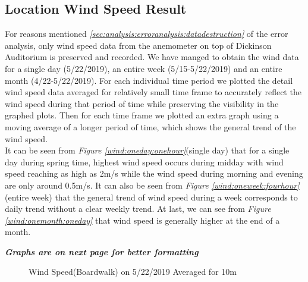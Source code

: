 \documentclass[review]{elsarticle}
\begin{document}
\clearpage
\subsection{Location Wind Speed Result}
\label{sec:results:locwindspeedresults}
For reasons mentioned \textit{\ref{sec:analysis:erroranalysis:datadestruction}}  of the error analysis, only wind speed data from the anemometer on top of Dickinson Auditorium is preserved and recorded. We have manged to obtain 
the wind data for a single day (5/22/2019), an entire week (5/15-5/22/2019) and an entire month (4/22-5/22/2019). For each individual time period we plotted the detail wind speed data 
averaged for relatively small time frame to accurately reflect the wind speed during that period of time while preserving the visibility in the graphed plots. Then for each time frame 
we plotted an extra graph using a moving average of a longer period of time, which shows the general trend of the wind speed.
\\\indent It can be seen from \textit{Figure \ref{wind:oneday:onehour}}(single day) that for a single day during spring time, highest wind speed occurs during midday with wind speed reaching as high as 2m/s while the wind 
speed during morning and evening are only around 0.5m/s. It can also be seen from \textit{Figure \ref{wind:oneweek:fourhour}}(entire week) that the general trend of wind speed during a week corresponds to daily trend without 
a clear weekly trend. At last, we can see from \textit{Figure \ref{wind:onemonth:oneday}} that wind speed is generally higher at the end of a month.


\vspace{100pt}
\textit{\textbf{Graphs are on next page for better formatting}}

\clearpage


\begin{figure}
    \caption{Wind Speed(Boardwalk) on 5/22/2019 Averaged for 10m}
    \label{wind:oneday:tenminutes}
\end{figure}
\end{document}
